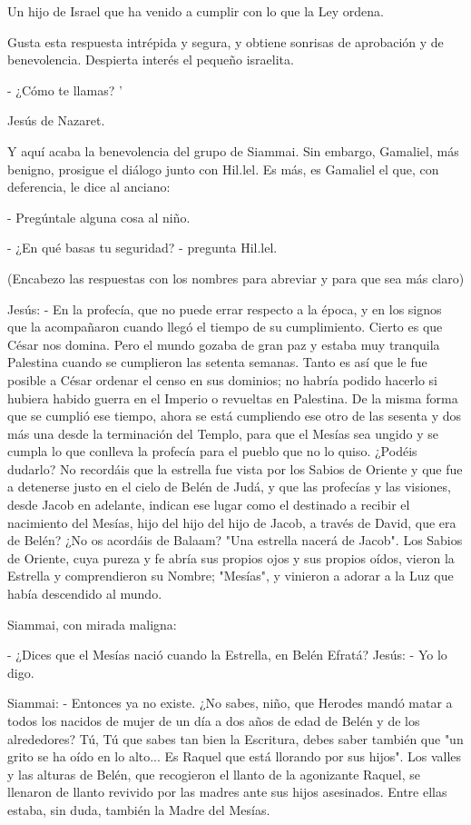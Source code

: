 \documentclass[12pt, twoside, openright]{book} %
\begin{document}
Un hijo de Israel que ha venido a cumplir con lo que la Ley ordena. 

Gusta esta respuesta intrépida y segura, y obtiene sonrisas de aprobación y de benevolencia. Despierta interés el pequeño israelita. 

- ¿Cómo te llamas? ' 

Jesús de Nazaret. 

Y aquí acaba la benevolencia del grupo de Siammai. Sin embargo, Gamaliel, más benigno, prosigue el diálogo junto con Hil.lel. Es más, es Gamaliel el que, con deferencia, le dice al anciano: 

- Pregúntale alguna cosa al niño. 

- ¿En qué basas tu seguridad? - pregunta Hil.lel. 

(Encabezo las respuestas con los nombres para abreviar y para que sea más claro) 

Jesús: - En la profecía, que no puede errar respecto a la época, y en los signos que la acompañaron cuando llegó el tiempo de su cumplimiento. Cierto es que César nos domina. Pero el mundo gozaba de gran paz y estaba muy tranquila Palestina cuando se cumplieron las setenta semanas. Tanto es así que le fue posible a César ordenar el censo en sus dominios; no habría podido hacerlo si hubiera habido guerra en el Imperio o revueltas en Palestina. De la misma forma que se cumplió ese tiempo, ahora se está cumpliendo ese otro de las sesenta y dos más una desde la terminación del Templo, para que el Mesías sea ungido y se cumpla lo que conlleva la profecía para el pueblo que no lo quiso. ¿Podéis dudarlo? No recordáis que la estrella fue vista por los Sabios de Oriente y que fue a detenerse justo en el cielo de Belén de Judá, y que las profecías y las visiones, desde Jacob en adelante, indican ese lugar como el destinado a recibir el nacimiento del Mesías, hijo del hijo del hijo de Jacob, a través de David, que era de Belén? ¿No os acordáis de Balaam? "Una estrella nacerá de Jacob". Los Sabios de Oriente, cuya pureza y fe abría sus propios ojos y sus propios oídos, vieron la Estrella y comprendieron su Nombre; "Mesías", y vinieron a adorar a la Luz que había descendido al mundo. 

Siammai, con mirada maligna: 

- ¿Dices que el Mesías nació cuando la Estrella, en Belén Efratá? Jesús: - Yo lo digo. 

Siammai: - Entonces ya no existe. ¿No sabes, niño, que Herodes mandó matar a todos los nacidos de mujer de un día a dos años de edad de Belén y de los alrededores? Tú, Tú que sabes tan bien la Escritura, debes saber también que "un grito se ha oído en lo alto... Es Raquel que está llorando por sus hijos". Los valles y las alturas de Belén, que recogieron el llanto de la agonizante Raquel, se llenaron de llanto revivido por las madres ante sus hijos asesinados. Entre ellas estaba, sin duda, también la Madre del Mesías. 
\end{document}
